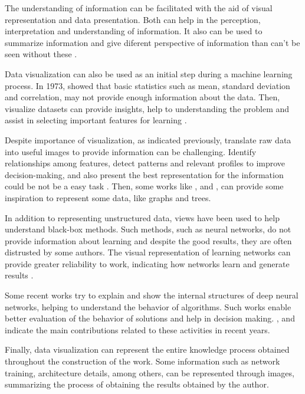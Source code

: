 {\color{red}


The understanding of information can be facilitated with the aid of visual representation and data presentation.
Both can help in the perception, interpretation and understanding of information.
It also can be used to summarize information and give diferent perspective of information than can't be seen without these \cite{Kirk:2016}.

Data visualization can also be used as an initial step during a machine learning process.
In 1973, \cite{Anscombe:1973} showed that basic statistics such as mean, standard deviation and correlation, may not provide enough information about the data.
Then, visualize datasets can provide insights, help to understanding the problem and assist in selecting important features for learning \cite{Marsland:2014}.

Despite importance of visualization, as indicated previously, translate raw data into useful images to provide information can be challenging.
Identify relationships among features, detect patterns and relevant profiles to improve decision-making, and also present the best representation for the information could be not be a easy task \cite{Vellido:2011}.
Then, some works like \cite{Wilkinson:2016}, \cite{Chang:2016} and \cite{Michailidis:2016}, can provide some inspiration to represent some data, like graphs and trees.

In addition to representing unstructured data, views have been used to help understand black-box methods.
Such methods, such as neural networks, do not provide information about learning and despite the good results, they are often distrusted by some authors.
The visual representation of learning networks can provide greater reliability to work, indicating how networks learn and generate results \cite{Chatzimparmpas:2020}.

Some recent works try to explain and show the internal structures of deep neural networks, helping to understand the behavior of algorithms.
Such works enable better evaluation of the behavior of solutions and help in decision making.
\cite{Chatzimparmpas:2020}, \cite{Hohman:2019} and \cite{Walny:2020} indicate the main contributions related to these activities in recent years.

Finally, data visualization can represent the entire knowledge process obtained throughout the construction of the work.
Some information such as network training, architecture details, among others, can be represented through images, summarizing the process of obtaining the results obtained by the author.
}

